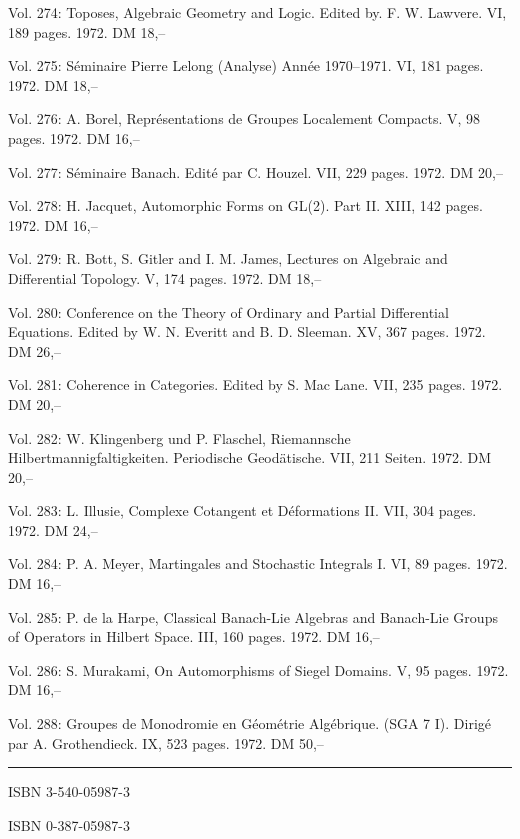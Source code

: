 Vol. 274: Toposes, Algebraic Geometry and Logic. Edited by. F. W. Lawvere. VI, 189 pages. 1972. DM 18,--

Vol. 275: Séminaire Pierre Lelong (Analyse) Année 1970--1971. VI, 181 pages. 1972. DM 18,--

Vol. 276: A. Borel, Représentations de Groupes Localement Compacts. V, 98 pages. 1972. DM 16,--

Vol. 277: Séminaire Banach. Edité par C. Houzel. VII, 229 pages. 1972. DM 20,--

Vol. 278: H. Jacquet, Automorphic Forms on GL(2). Part II. XIII, 142 pages. 1972. DM 16,--

Vol. 279: R. Bott, S. Gitler and I. M. James, Lectures on Algebraic and Differential Topology. V, 174 pages. 1972. DM 18,--

Vol. 280: Conference on the Theory of Ordinary and Partial Differential Equations. Edited by W. N. Everitt and B. D. Sleeman. XV, 367 pages. 1972. DM 26,--

Vol. 281: Coherence in Categories. Edited by S. Mac Lane. VII, 235 pages. 1972. DM 20,--

Vol. 282: W. Klingenberg und P. Flaschel, Riemannsche Hilbertmannigfaltigkeiten. Periodische Geodätische. VII, 211 Seiten. 1972. DM 20,--

Vol. 283: L. Illusie, Complexe Cotangent et Déformations II. VII, 304 pages. 1972. DM 24,--

Vol. 284: P. A. Meyer, Martingales and Stochastic Integrals I. VI, 89 pages. 1972. DM 16,--

Vol. 285: P. de la Harpe, Classical Banach-Lie Algebras and Banach-Lie Groups of Operators in Hilbert Space. III, 160 pages. 1972. DM 16,--

Vol. 286: S. Murakami, On Automorphisms of Siegel Domains. V, 95 pages. 1972. DM 16,--

Vol. 288: Groupes de Monodromie en Géométrie Algébrique. (SGA 7 I). Dirigé par A. Grothendieck. IX, 523 pages. 1972. DM 50,--

\noindent\rule{\linewidth}{0.4pt}



ISBN 3-540-05987-3

ISBN 0-387-05987-3

